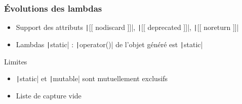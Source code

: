 \documentclass[C++.tex]{subfiles}
\begin{document}
\begin{frame}[fragile]
	\frametitle{Évolutions des lambdas}
	\begin{itemize}
		\item Support des attributs \texttt|[[ nodiscard ]]|, \texttt|[[ deprecated ]]|, \texttt|[[ noreturn ]]|
		\item Lambdas \texttt|static| : \texttt|operator()| de l'objet généré est \texttt|static|
	\end{itemize}

	\begin{alertblock}{Limites}
		\begin{itemize}
			\item \texttt|static| et \texttt|mutable| sont mutuellement exclusifs
			\item Liste de capture vide
		\end{itemize}
	\end{alertblock}


\end{frame}
\end{document}
